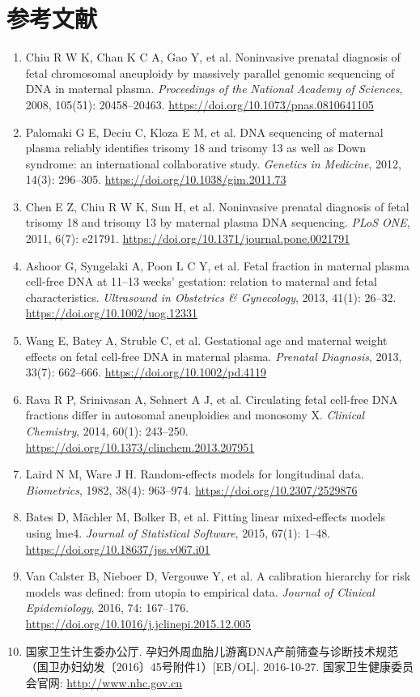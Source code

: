 \documentclass[11pt,a4paper]{ctexart}
\begin{document}
\section{参考文献}
\begin{enumerate}
\item Chiu R W K, Chan K C A, Gao Y, et al. Noninvasive prenatal diagnosis of fetal chromosomal aneuploidy by massively parallel genomic sequencing of DNA in maternal plasma. \emph{Proceedings of the National Academy of Sciences}, 2008, 105(51): 20458--20463. \url{https://doi.org/10.1073/pnas.0810641105}
\item Palomaki G E, Deciu C, Kloza E M, et al. DNA sequencing of maternal plasma reliably identifies trisomy 18 and trisomy 13 as well as Down syndrome: an international collaborative study. \emph{Genetics in Medicine}, 2012, 14(3): 296--305. \url{https://doi.org/10.1038/gim.2011.73}
\item Chen E Z, Chiu R W K, Sun H, et al. Noninvasive prenatal diagnosis of fetal trisomy 18 and trisomy 13 by maternal plasma DNA sequencing. \emph{PLoS ONE}, 2011, 6(7): e21791. \url{https://doi.org/10.1371/journal.pone.0021791}
\item Ashoor G, Syngelaki A, Poon L C Y, et al. Fetal fraction in maternal plasma cell-free DNA at 11--13 weeks' gestation: relation to maternal and fetal characteristics. \emph{Ultrasound in Obstetrics \& Gynecology}, 2013, 41(1): 26--32. \url{https://doi.org/10.1002/uog.12331}
\item Wang E, Batey A, Struble C, et al. Gestational age and maternal weight effects on fetal cell-free DNA in maternal plasma. \emph{Prenatal Diagnosis}, 2013, 33(7): 662--666. \url{https://doi.org/10.1002/pd.4119}
\item Rava R P, Srinivasan A, Sehnert A J, et al. Circulating fetal cell-free DNA fractions differ in autosomal aneuploidies and monosomy X. \emph{Clinical Chemistry}, 2014, 60(1): 243--250. \url{https://doi.org/10.1373/clinchem.2013.207951}
\item Laird N M, Ware J H. Random-effects models for longitudinal data. \emph{Biometrics}, 1982, 38(4): 963--974. \url{https://doi.org/10.2307/2529876}
\item Bates D, M\"achler M, Bolker B, et al. Fitting linear mixed-effects models using lme4. \emph{Journal of Statistical Software}, 2015, 67(1): 1--48. \url{https://doi.org/10.18637/jss.v067.i01}
\item Van Calster B, Nieboer D, Vergouwe Y, et al. A calibration hierarchy for risk models was defined: from utopia to empirical data. \emph{Journal of Clinical Epidemiology}, 2016, 74: 167--176. \url{https://doi.org/10.1016/j.jclinepi.2015.12.005}
\item 国家卫生计生委办公厅. 孕妇外周血胎儿游离DNA产前筛查与诊断技术规范（国卫办妇幼发〔2016〕45号附件1）[EB/OL]. 2016-10-27. 国家卫生健康委员会官网: \url{http://www.nhc.gov.cn}
\end{enumerate}
\end{document}
